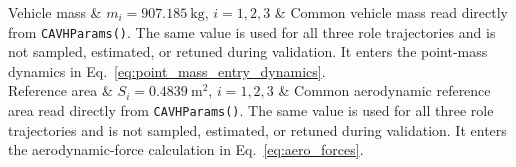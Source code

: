 ﻿Vehicle mass & \(m_i=907.185~\mathrm{kg}\), \(i=1,2,3\) & Common vehicle mass read directly from \texttt{CAVHParams()}. The same value is used for all three role trajectories and is not sampled, estimated, or retuned during validation. It enters the point-mass dynamics in Eq.~\eqref{eq:point_mass_entry_dynamics}. \\

Reference area & \(S_i=0.4839~\mathrm{m^2}\), \(i=1,2,3\) & Common aerodynamic reference area read directly from \texttt{CAVHParams()}. The same value is used for all three role trajectories and is not sampled, estimated, or retuned during validation. It enters the aerodynamic-force calculation in Eq.~\eqref{eq:aero_forces}. \\
